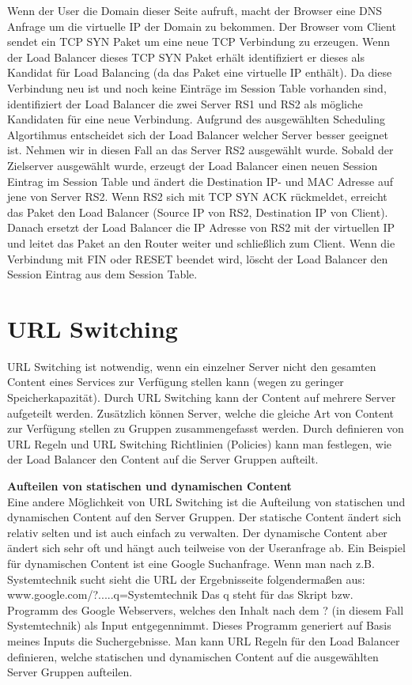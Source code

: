 Wenn der User die Domain dieser Seite aufruft, macht der Browser eine DNS Anfrage um die virtuelle IP der Domain zu bekommen. Der Browser vom Client sendet ein TCP SYN Paket um eine neue TCP Verbindung zu erzeugen. Wenn der Load Balancer dieses TCP SYN Paket erhält identifiziert er dieses als Kandidat für Load Balancing (da das Paket eine virtuelle IP enthält). Da diese Verbindung neu ist und noch keine Einträge im Session Table vorhanden sind, identifiziert der Load Balancer die zwei Server RS1 und RS2 als mögliche Kandidaten für eine neue Verbindung. Aufgrund des ausgewählten Scheduling Algortihmus entscheidet sich der Load Balancer welcher Server besser geeignet ist. Nehmen wir in diesen Fall an das Server RS2 ausgewählt wurde. Sobald der Zielserver ausgewählt wurde, erzeugt der Load Balancer einen neuen Session Eintrag im Session Table und ändert die Destination IP- und MAC Adresse auf jene von Server RS2. Wenn RS2 sich mit TCP SYN ACK rückmeldet, erreicht das Paket den Load Balancer (Source IP von RS2, Destination IP von Client). Danach ersetzt der Load Balancer die IP Adresse von RS2 mit der virtuellen IP und leitet das Paket an den Router weiter und schließlich zum Client. Wenn die Verbindung mit FIN oder RESET beendet wird, löscht der Load Balancer den Session Eintrag aus dem Session Table. \cite{LoadBalancing2}

\section{URL Switching}
\label{sec:URL Switching}

URL Switching ist notwendig, wenn ein einzelner Server nicht den gesamten Content eines Services zur Verfügung stellen kann (wegen zu geringer Speicherkapazität). Durch URL  Switching kann der Content auf mehrere Server aufgeteilt werden. Zusätzlich können Server, welche die gleiche Art von Content zur Verfügung stellen zu Gruppen zusammengefasst werden. Durch definieren von URL Regeln und URL Switching Richtlinien (Policies) kann man festlegen, wie der Load Balancer den Content auf die Server Gruppen aufteilt.\vspace{5mm}

\textbf{Aufteilen von statischen und dynamischen Content} \\

Eine andere Möglichkeit von URL Switching ist die Aufteilung von statischen und dynamischen Content auf den Server Gruppen. Der statische Content ändert sich relativ selten und ist auch einfach zu verwalten. Der dynamische Content aber ändert sich sehr oft und hängt auch teilweise von der Useranfrage ab. 
Ein Beispiel für dynamischen Content ist eine Google Suchanfrage. Wenn man nach z.B. Systemtechnik sucht sieht die URL der Ergebnisseite folgendermaßen aus: 
www.google.com/?.....q=Systemtechnik
Das q steht für das Skript bzw. Programm des Google Webservers, welches den Inhalt nach dem ? (in diesem Fall Systemtechnik) als Input entgegennimmt. Dieses Programm generiert auf Basis meines Inputs die Suchergebnisse.
Man kann URL Regeln für den Load Balancer definieren, welche statischen und dynamischen Content auf die ausgewählten Server Gruppen aufteilen.\vspace{5mm}

